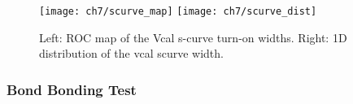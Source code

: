 \begin{figure}[!h]
  \centering
  \texttt{[image: ch7/scurve\_map]}
  \texttt{[image: ch7/scurve\_dist]}
  \caption[Scurve test]{Left: ROC map of the Vcal s-curve turn-on widths. Right: 1D distribution of the vcal scurve width.}\label{fig:vis_insp}
\end{figure}



\subsubsection{Bond Bonding Test}








